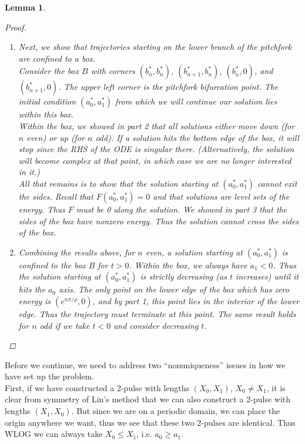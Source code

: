 \documentclass[12pt]{article}
\newtheorem{lemma}{Lemma}
\begin{document}
\begin{lemma}
\begin{proof}
\begin{enumerate}
\item Next, we show that trajectories starting on the lower branch of the pitchfork are confined to a box.\\ 

Consider the box $B$ with corners $(b^*_n, b^*_n)$, $(b^*_{n+1}, b^*_n)$, $(b^*_n, 0)$, and $(b^*_{n+1}, 0)$. The upper left corner is the pitchfork bifurcation point. The initial condition $(a_0^*, a_1^*)$ from which we will continue our solution lies within this box.\\

Within the box, we showed in part 2 that all solutions either move down (for $n$ even) or up (for $n$ odd). If a solution hits the bottom edge of the box, it will stop since the RHS of the ODE is singular there. (Alternatively, the solution will become complex at that point, in which case we are no longer interested in it.)\\

All that remains is to show that the solution starting at $(a_0^*, a_1^*)$ cannot exit the sides. Recall that $F(a_0^*, a_1^*) = 0$ and that solutions are level sets of the energy. Thus $F$ must be 0 along the solution. We showed in part 3 that the sides of the box have nonzero energy. Thus the solution cannot cross the sides of the box.

\item Combining the results above, for $n$ even, a solution starting at $(a_0^*, a_1^*)$ is confined to the box $B$ for $t > 0$. Within the box, we always have $\dot a_1 < 0$. Thus the solution starting at $(a_0^*, a_1^*)$ is strictly decreasing (as $t$ increases) until it hits the $a_0$ axis. The only point on the lower edge of the box which has zero energy is $(e^{n \pi/\rho}, 0)$, and by part 1, this point lies in the interior of the lower edge. Thus the trajectory must terminate at this point. The same result holds for $n$ odd if we take $t < 0$ and consider decreasing $t$.

\end{enumerate}

\end{proof}
\end{lemma}

Before we continue, we need to address two ``nonuniqueness'' issues in how we have set up the problem.\\

First, if we have constructed a 2-pulse with lengths $(X_0, X_1)$, $X_0 \neq X_1$, it is clear from symmetry of Lin's method that we can also construct a 2-pulse with lengths $(X_1, X_0)$. But since we are on a periodic domain, we can place the origin anywhere we want, thus we see that these two 2-pulses are identical. Thus WLOG we can always take $X_0 \leq X_1$, i.e. $a_0 \geq a_1$.\\
\end{document}
